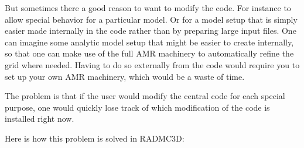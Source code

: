 \documentclass[letterpaper,10pt,english]{sphinxmanual}
\begin{document}
But sometimes there  a good reason to want to modify the code.  For
instance to allow special behavior for a particular model. Or for a model
setup that is simply easier made internally in the code rather than by
preparing large input files. One can imagine some analytic model setup
that might be easier to create internally, so that one can make use of
the full AMR machinery to automatically refine the grid where needed.
Having to do so externally from the code would require you to set up
your own AMR machinery, which would be a waste of time.

The problem is that if the user would modify the central code for each
special purpose, one would quickly lose track of which modification of the
code is installed right now.

Here is how this problem is solved in RADMC\sphinxhyphen{}3D:
\end{document}
